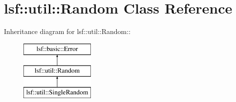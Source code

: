 \hypertarget{classlsf_1_1util_1_1Random}{
\section{lsf::util::Random Class Reference}
\label{classlsf_1_1util_1_1Random}
}
Inheritance diagram for lsf::util::Random::\begin{figure}[H]
\begin{center}
\leavevmode
\includegraphics[height=3cm]{classlsf_1_1util_1_1Random}
\end{center}
\end{figure}
